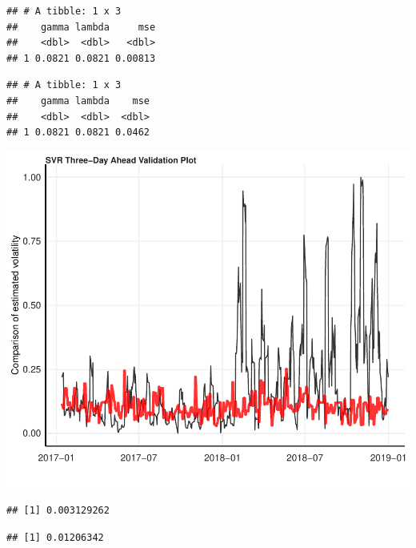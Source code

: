 \documentclass[11pt,preprint, authoryear]{elsarticle}
\let\origfigure\figure
\let\endorigfigure\endfigure
\renewenvironment{figure}[1][2] {
    \expandafter\origfigure\expandafter[H]
} {
    \endorigfigure
}
\numberwithin{equation}{section}
\numberwithin{figure}{section}
\numberwithin{table}{section}
\begin{document}
\begin{verbatim}
## # A tibble: 1 x 3
##    gamma lambda     mse
##    <dbl>  <dbl>   <dbl>
## 1 0.0821 0.0821 0.00813
\end{verbatim}

\begin{verbatim}
## # A tibble: 1 x 3
##    gamma lambda    mse
##    <dbl>  <dbl>  <dbl>
## 1 0.0821 0.0821 0.0462
\end{verbatim}

\begin{figure}[H]

{\centering \includegraphics{Essay_files/figure-latex/plot_val_3-1} 

}

\caption{SVR Three-Day Ahead Validation Forecast}\label{fig:plot_val_3}
\end{figure}

\begin{verbatim}
## [1] 0.003129262
\end{verbatim}

\begin{verbatim}
## [1] 0.01206342
\end{verbatim}
\end{document}
